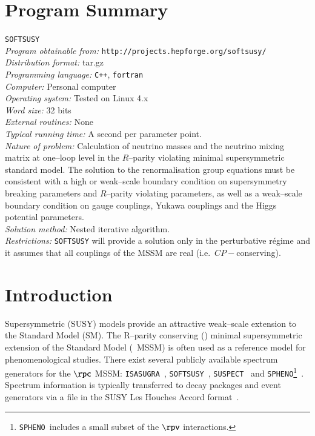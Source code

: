 \documentclass[pdflatex,final,3p,times]{elsarticle}
\def\SOFTSUSY{{\tt SOFTSUSY}}
\def\SUSPECT{{\tt SUSPECT}}
\def\SPHENO{{\tt SPHENO}}
\def\ISASUGRA{{\tt ISASUGRA}}
\begin{document}
\section{Program Summary}
 \SOFTSUSY{}\\
{\em Program obtainable
  from:} {\tt http://projects.hepforge.org/softsusy/}\\
{\em Distribution format:}\/ tar.gz\\
{\em Programming language:} {\tt C++}, {\tt fortran}\\
{\em Computer:}\/ Personal computer\\
{\em Operating system:}\/ Tested on Linux 4.x\\
{\em Word size:}\/ 32 bits\\
{\em External routines:}\/ None\\
{\em Typical running time:}\/ A second per parameter point.\\
{\em Nature of problem:}\/ Calculation of neutrino masses and the neutrino
mixing matrix at one--loop level
in the $R$--parity violating minimal supersymmetric standard 
model. The solution to the renormalisation group equations must be consistent
with a high or weak--scale boundary condition on supersymmetry breaking
parameters and $R$--parity violating parameters, as well as a weak--scale boundary condition
on gauge couplings, Yukawa couplings and the Higgs potential parameters.\\
{\em Solution method:}\/ Nested iterative algorithm. \\
{\em Restrictions:} {\SOFTSUSY} will provide a solution only in the
perturbative r\'{e}gime and it assumes that all couplings of the MSSM are real
(i.e.\ $CP-$conserving). 

\newpage

\section{Introduction}

Supersymmetric (SUSY) models provide an attractive weak--scale
extension to the Standard Model (SM).  The R--parity
conserving (\rpc) minimal supersymmetric extension of the Standard Model
(\rpc~MSSM) is often used as a reference model for phenomenological
studies.  There exist several publicly available spectrum generators
for the $\rpc$ MSSM: \ISASUGRA~\cite{Paige:2003mg},
\SOFTSUSY~\cite{Allanach:2001kg}, \SUSPECT~\cite{Djouadi:2002ze} and
\SPHENO\footnote{\SPHENO~includes a small subset of the $\rpv$ interactions.}~\cite{Porod:2003um}.  Spectrum information is typically
transferred to decay packages and event generators via a file in the
SUSY Les Houches Accord format~\cite{Skands:2003cj,Allanach:2008qq}.
\end{document}
